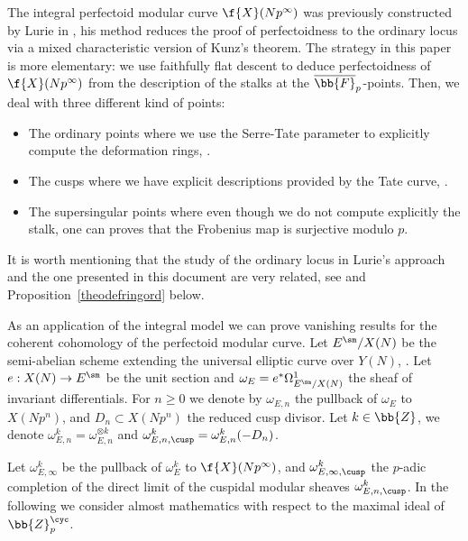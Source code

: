The integral perfectoid modular curve $\f{X}(Np^\infty)$ was previously constructed by Lurie in \cite{JacobFullLevel2019}, his method reduces the proof of perfectoidness to the ordinary locus via a mixed characteristic version of Kunz's theorem. The strategy in this paper is more elementary: we use faithfully flat descent to deduce perfectoidness of $\f{X}(Np^\infty)$ from the description of the stalks at the $\overline{\bb{F}}_p$-points. Then, we deal with three different kind of points:
\begin{itemize}
\item The ordinary points where we use the Serre-Tate parameter to explicitly compute the deformation rings, \cf \cite[\S 2]{katz1981serre}.
\item The cusps where we have explicit descriptions provided by the Tate curve, \cf \cite[\S 8--10]{katz1985arithmetic}.
\item The supersingular points where even though we do not compute explicitly the stalk, one can proves that the Frobenius map is surjective modulo $p$.
\end{itemize}
It is worth mentioning that the study of the ordinary locus in Lurie's approach and the one presented in this document are very related, see \cite[Prop.\,2.2]{JacobFullLevel2019} and Proposition~\ref{theodefringord} below.

As an application of the integral model we can prove vanishing results for the coherent cohomology of the perfectoid modular curve. Let $E^{\sm}/X(N)$ be the semi-abelian scheme extending the universal elliptic curve over $Y(N)$, \cf \cite{deligne1973schemas}. Let \hbox{$e: X(N)\to E^{\sm}$} be the unit section and $\omega_E= e^* \Omega^1_{E^{\sm}/X(N)}$ the sheaf of invariant differentials. For $n\geq 0$ we denote by $\omega_{E,n}$ the pullback of $\omega_E$ to $X(Np^n)$, and $D_n\subset X(Np^n)$ the reduced cusp divisor. Let $k\in \bb{Z}$, we denote $\omega^{k}_{E,n}= \omega^{\otimes k}_{E,n}$ and $\omega^{k}_{E,n,\cusp}= \omega^k_{E,n}(-D_n)$.

Let $\omega^k_{E,\infty}$ be the pullback of $\omega_E^k$ to $\f{X}(Np^\infty)$, and $\omega^k_{E,\infty, \cusp}$ the $p$-adic completion of the direct limit of the cuspidal modular sheaves $\omega^k_{E,n,\cusp}$. In the following we consider almost mathematics with respect to the maximal ideal of $\bb{Z}_p^{\cyc}$.

